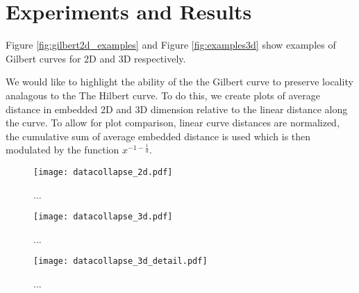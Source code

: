 \section{Experiments and Results}

Figure \ref{fig:gilbert2d_examples} and Figure \ref{fig:examples3d} show examples of Gilbert curves for 2D and 3D respectively.

We would like to highlight the ability of the the Gilbert curve to preserve locality analagous to the The Hilbert curve.
To do this, we create plots of average distance in embedded 2D and 3D dimension relative to the linear distance along the curve.
To allow for plot comparison, linear curve distances are normalized, the cumulative sum of average embedded distance is
used which is then modulated by the function $x^{-1-\frac{1}{d}}$.



\begin{figure}[h]
  \centering
  \texttt{[image: datacollapse\_2d.pdf]}
  \caption{ ... }
\end{figure}

\begin{figure}[h]
  \centering
  \texttt{[image: datacollapse\_3d.pdf]}
  \caption{ ... }
\end{figure}

\begin{figure}[h]
  \centering
  \texttt{[image: datacollapse\_3d\_detail.pdf]}
  \caption{ ... }
\end{figure}
